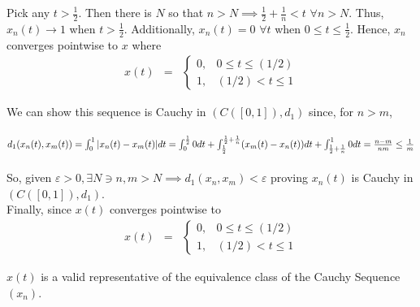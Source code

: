 \documentclass[11pt]{SelfArxOneColBMN}
\begin{document}
\begin{solution}
	Pick any $t > \frac{1}{2}.$ Then there is $N$ so that $n > N \implies \frac{1}{2} + \frac{1}{n} < t$ \space $ \forall n > N$. Thus, $x_n(t) \rightarrow 1$ when $t > \frac{1}{2}$. Additionally, $x_n(t) = 0$ \space $ \forall t$ when $ 0 \leq t \leq \frac{1}{2}$. Hence, $x_n$ converges pointwise to $x$ where
\begin{eqnarray*}
x(t) &=&
\left \{
\begin{array}{ll}
0, & 0 \leq t \leq (1/2)\\
1, & (1/2)  < t \leq 1
\end{array}
\right .
\end{eqnarray*}

	We can show this sequence is Cauchy in $(C([0,1]),d_1)$ since, for $n > m$,\\
	\\
	$d_1(x_n(t),x_m(t)) = \int_0^1|x_n(t) - x_m(t)|dt\\
	\\
	= \int_0^{\frac{1}{2}}0dt + \int_{\frac{1}{2}}^{\frac{1}{2} + \frac{1}{n}}(x_m(t) - x_n(t))dt + \int_{\frac{1}{2} + \frac{1}{n}}^10dt\\
	\\
	= \frac{n-m}{nm} \leq \frac{1}{m}$
\\
\\
	So, given $\varepsilon > 0, \exists N \ni n,m > N \implies d_1(x_n,x_m) < \varepsilon$ proving $x_n(t)$ is Cauchy in $(C([0,1]), d_1)$.\\
	Finally, since $x(t)$ converges pointwise to
\begin{eqnarray*}
x(t) &=&
\left \{
\begin{array}{ll}
0, & 0 \leq t \leq (1/2)\\
1, & (1/2)  < t \leq 1
\end{array}
\right .
\end{eqnarray*}

	$x(t)$ is a valid representative of the equivalence class of the Cauchy Sequence $(x_n)$.

\end{solution}
	
\end{document}
